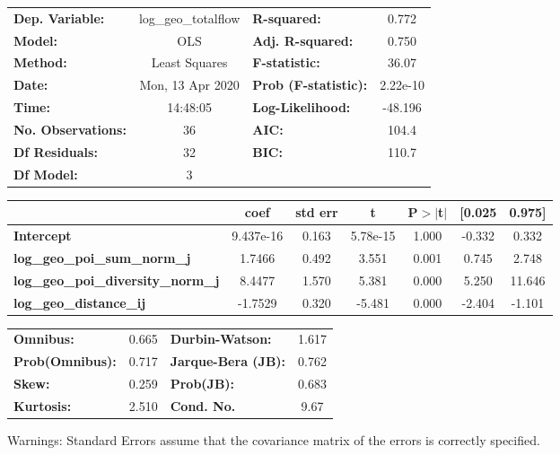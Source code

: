 \begin{center}
\begin{tabular}{lclc}
\toprule
\textbf{Dep. Variable:}                    & log\_geo\_totalflow & \textbf{  R-squared:         } &     0.772   \\
\textbf{Model:}                            &         OLS         & \textbf{  Adj. R-squared:    } &     0.750   \\
\textbf{Method:}                           &    Least Squares    & \textbf{  F-statistic:       } &     36.07   \\
\textbf{Date:}                             &   Mon, 13 Apr 2020  & \textbf{  Prob (F-statistic):} &  2.22e-10   \\
\textbf{Time:}                             &       14:48:05      & \textbf{  Log-Likelihood:    } &   -48.196   \\
\textbf{No. Observations:}                 &            36       & \textbf{  AIC:               } &     104.4   \\
\textbf{Df Residuals:}                     &            32       & \textbf{  BIC:               } &     110.7   \\
\textbf{Df Model:}                         &             3       & \textbf{                     } &             \\
\bottomrule
\end{tabular}
\begin{tabular}{lcccccc}
                                           & \textbf{coef} & \textbf{std err} & \textbf{t} & \textbf{P$> |$t$|$} & \textbf{[0.025} & \textbf{0.975]}  \\
\midrule
\textbf{Intercept}                         &    9.437e-16  &        0.163     &  5.78e-15  &         1.000        &       -0.332    &        0.332     \\
\textbf{log\_geo\_poi\_sum\_norm\_j}       &       1.7466  &        0.492     &     3.551  &         0.001        &        0.745    &        2.748     \\
\textbf{log\_geo\_poi\_diversity\_norm\_j} &       8.4477  &        1.570     &     5.381  &         0.000        &        5.250    &       11.646     \\
\textbf{log\_geo\_distance\_ij}            &      -1.7529  &        0.320     &    -5.481  &         0.000        &       -2.404    &       -1.101     \\
\bottomrule
\end{tabular}
\begin{tabular}{lclc}
\textbf{Omnibus:}       &  0.665 & \textbf{  Durbin-Watson:     } &    1.617  \\
\textbf{Prob(Omnibus):} &  0.717 & \textbf{  Jarque-Bera (JB):  } &    0.762  \\
\textbf{Skew:}          &  0.259 & \textbf{  Prob(JB):          } &    0.683  \\
\textbf{Kurtosis:}      &  2.510 & \textbf{  Cond. No.          } &     9.67  \\
\bottomrule
\end{tabular}
\end{center}

Warnings: \newline
 [1] Standard Errors assume that the covariance matrix of the errors is correctly specified.